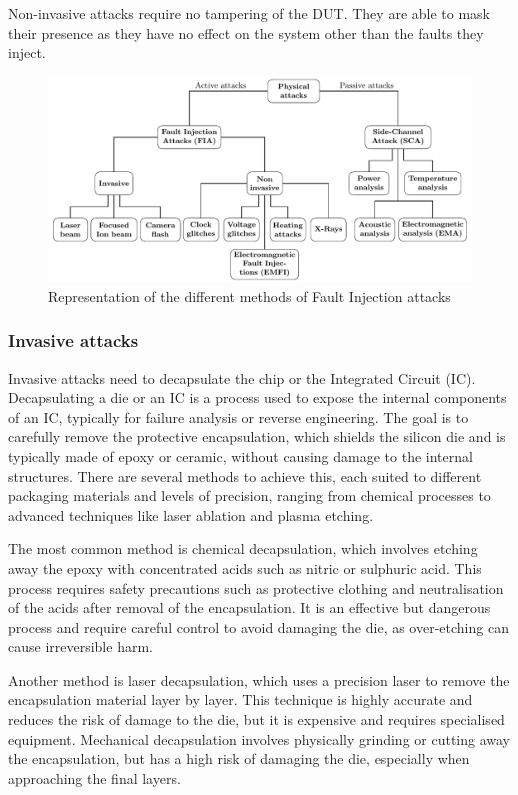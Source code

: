 Non-invasive attacks require no tampering of the DUT. They are able to mask their presence as they have no effect on the system other than the faults they inject.

\begin{figure}[ht]
    \centering
    \includegraphics[page=2, width=.75\textwidth]{c2_soa/img/physicalAttacks.pdf}
    \caption{Representation of the different methods of Fault Injection attacks}
    \label{fig:fia}
\end{figure}

\subsubsection{Invasive attacks}
\label{subsubsection:invasiveAttacks}
Invasive attacks need to decapsulate the chip or the Integrated Circuit (IC).
Decapsulating a die or an IC is a process used to expose the internal components of an IC, typically for failure analysis or reverse engineering. The goal is to carefully remove the protective encapsulation, which shields the silicon die and is typically made of epoxy or ceramic, without causing damage to the internal structures. There are several methods to achieve this, each suited to different packaging materials and levels of precision, ranging from chemical processes to advanced techniques like laser ablation and plasma etching.

The most common method is chemical decapsulation, which involves etching away the epoxy with concentrated acids such as nitric or sulphuric acid. This process requires safety precautions such as protective clothing and neutralisation of the acids after removal of the encapsulation. It is an effective but dangerous process and require careful control to avoid damaging the die, as over-etching can cause irreversible harm.

Another method is laser decapsulation, which uses a precision laser to remove the encapsulation material layer by layer. This technique is highly accurate and reduces the risk of damage to the die, but it is expensive and requires specialised equipment. Mechanical decapsulation involves physically grinding or cutting away the encapsulation, but has a high risk of damaging the die, especially when approaching the final layers.

